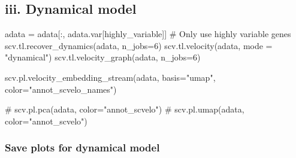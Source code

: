 \documentclass[
  letterpaper,
  DIV=11,
  numbers=noendperiod]{scrreprt}
\newenvironment{Shaded}{\begin{snugshade}}{\end{snugshade}}
\newcommand{\CommentTok}[1]{\textcolor[rgb]{0.37,0.37,0.37}{#1}}
\newcommand{\DecValTok}[1]{\textcolor[rgb]{0.68,0.00,0.00}{#1}}
\newcommand{\NormalTok}[1]{\textcolor[rgb]{0.00,0.23,0.31}{#1}}
\newcommand{\OperatorTok}[1]{\textcolor[rgb]{0.37,0.37,0.37}{#1}}
\newcommand{\StringTok}[1]{\textcolor[rgb]{0.13,0.47,0.30}{#1}}
\begin{document}
\subsection{iii. Dynamical model}\label{iii.-dynamical-model}

\begin{Shaded}
\begin{Highlighting}[]
\NormalTok{adata }\OperatorTok{=}\NormalTok{ adata[:, adata.var[}\StringTok{\textquotesingle{}highly\_variable\textquotesingle{}}\NormalTok{]]  }\CommentTok{\# Only use highly variable genes}
\NormalTok{scv.tl.recover\_dynamics(adata, n\_jobs}\OperatorTok{=}\DecValTok{6}\NormalTok{)}
\NormalTok{scv.tl.velocity(adata, mode }\OperatorTok{=} \StringTok{"dynamical"}\NormalTok{)}
\NormalTok{scv.tl.velocity\_graph(adata, n\_jobs}\OperatorTok{=}\DecValTok{6}\NormalTok{)}

\NormalTok{scv.pl.velocity\_embedding\_stream(adata, basis}\OperatorTok{=}\StringTok{"umap"}\NormalTok{, color}\OperatorTok{=}\StringTok{"annot\_scvelo\_names"}\NormalTok{)}

\CommentTok{\# scv.pl.pca(adata, color="annot\_scvelo")}
\CommentTok{\# scv.pl.umap(adata, color="annot\_scvelo")}
\end{Highlighting}
\end{Shaded}

\subsubsection{Save plots for dynamical
model}\label{save-plots-for-dynamical-model}
\end{document}
